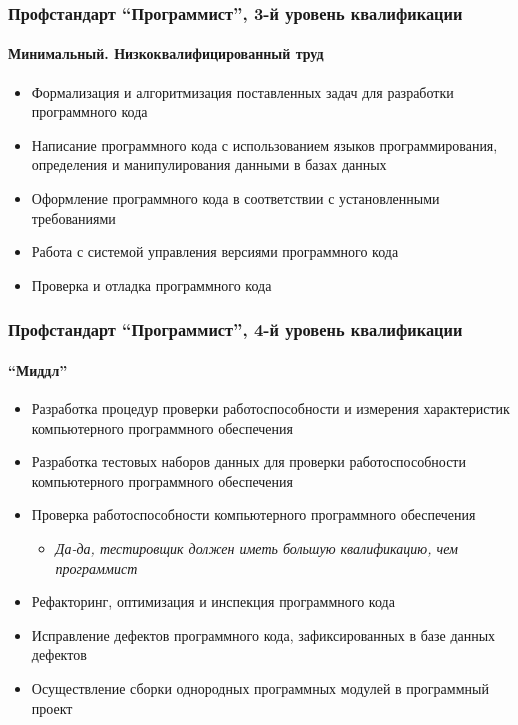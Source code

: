 \documentclass{../../slides-style}
\begin{document}
    \begin{frame}
        \frametitle{Профстандарт \enquote{Программист}, 3-й уровень квалификации}
        \framesubtitle{Минимальный. Низкоквалифицированный труд}
        \begin{itemize}
            \item Формализация и алгоритмизация поставленных задач для разработки программного кода
            \item Написание программного кода с использованием языков программирования, определения и манипулирования данными в базах данных
            \item Оформление программного кода в соответствии с установленными требованиями
            \item Работа с системой управления версиями программного кода
            \item Проверка и отладка программного кода
        \end{itemize}
    \end{frame}

    \begin{frame}
        \frametitle{Профстандарт \enquote{Программист}, 4-й уровень квалификации}
        \framesubtitle{\enquote{Миддл}}
        \begin{itemize}
            \item Разработка процедур проверки работоспособности и измерения характеристик компьютерного программного обеспечения
            \item Разработка тестовых наборов данных для проверки работоспособности компьютерного программного обеспечения
            \item Проверка работоспособности компьютерного программного обеспечения
            \begin{itemize}
                \item \emph{Да-да, тестировщик должен иметь большую квалификацию, чем программист}
            \end{itemize}
            \item Рефакторинг, оптимизация и инспекция программного кода
            \item Исправление дефектов программного кода, зафиксированных в базе данных дефектов
            \item Осуществление сборки однородных программных модулей в программный проект
        \end{itemize}
    \end{frame}
\end{document}
